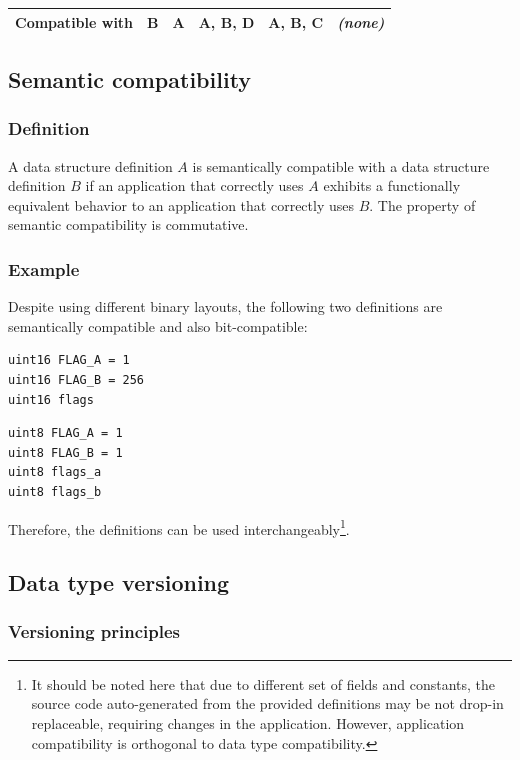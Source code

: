 \begin{table}[H]
\begin{tabu}{|l|X|X|X|X|X|}
\textbf{Compatible with}
&B                   & A                   & A, B, D             & A, B, C             & \emph{(none)}     \\
\hline
\end{tabu}
\end{table}

\subsection{Semantic compatibility}\label{sec:dsdl_semantic_compatibility}

\subsubsection{Definition}

A data structure definition $A$ is semantically compatible with a data structure definition $B$
if an application that correctly uses $A$ exhibits a functionally equivalent behavior to an application
that correctly uses $B$.
The property of semantic compatibility is commutative.

\subsubsection{Example}

Despite using different binary layouts, the following two definitions are semantically compatible
and also bit-compatible:

\begin{verbatim}
uint16 FLAG_A = 1
uint16 FLAG_B = 256
uint16 flags
\end{verbatim}

\begin{verbatim}
uint8 FLAG_A = 1
uint8 FLAG_B = 1
uint8 flags_a
uint8 flags_b
\end{verbatim}

Therefore, the definitions can be used
interchangeably\footnote{It should be noted here that due to different set of fields and constants,
the source code auto-generated from the provided definitions may be not drop-in replaceable,
requiring changes in the application. However, application compatibility is orthogonal to
data type compatibility.}.

\subsection{Data type versioning}

\subsubsection{Versioning principles}

